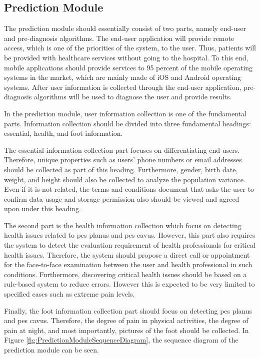 \subsection{ Prediction Module }

The prediction module should essentially consist of two parts, namely end-user and pre-diagnosis algorithms. The end-user application will provide remote access, which is one of the priorities of the system, to the user. Thus, patients will be provided with healthcare services without going to the hospital. To this end, mobile applications should provide services to 95 percent of the mobile operating systems in the market, which are mainly made of iOS and Android operating systems. After user information is collected through the end-user application, pre-diagnosis algorithms will be used to diagnose the user and provide results.

In the prediction module, user information collection is one of the fundamental parts. Information collection should be divided into three fundamental headings: essential, health, and foot information. 

The essential information collection part focuses on differentiating end-users. Therefore, unique properties such as users' phone numbers or email addresses should be collected as part of this heading. Furthermore, gender, birth date, weight, and height should also be collected to analyze the population variance. Even if it is not related, the terms and conditions document that asks the user to confirm data usage and storage permission also should be viewed and agreed upon under this heading.

The second part is the health information collection which focus on detecting health issues related to pes planus and pes cavus. However, this part also requires the system to detect the evaluation requirement of health professionals for critical health issues. Therefore, the system should propose a direct call or appointment for the face-to-face examination between the user and health professional in such conditions. Furthermore, discovering critical health issues should be based on a rule-based system to reduce errors. However this is expected to be very limited to specified cases such as extreme pain levels.

Finally, the foot information collection part should focus on detecting pes planus and pes cavus. Therefore, the degree of pain in physical activities, the degree of pain at night, and most importantly, pictures of the foot should be collected. In Figure \ref{fig:PredictionModuleSequenceDiagram}, the sequence diagram of the prediction module can be seen.

